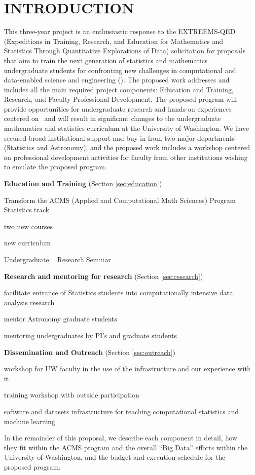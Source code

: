 \section{ INTRODUCTION}

This three-year project is an enthusiastic response to the EXTREEMS-QED (Expeditions in Training, Research, 
and Education for Mathematics and Statistics Through Quantitative Explorations of Data) solicitation for proposals
that aim to train the next generation of statistics and mathematics undergraduate students for confronting new
challenges in computational and data-enabled science and engineering (\cdse).  The proposed work addresses and 
includes all the main required project components: Education and Training, Research, and Faculty Professional 
Development. The proposed program will provide opportunities for undergraduate research and hands-on experiences 
centered on \cdse\ and will result in significant changes to the undergraduate mathematics and statistics curriculum 
at the University of Washington. We have secured broad institutional support and buy-in from two major departments 
(Statistics and Astronomy), and the proposed work includes a workshop centered on professional development activities
for faculty from other institutions wishing to emulate the proposed program. 

\bits
\item[]{\bf Education and Training} (Section \ref{sec:education}) 
\item Transform the ACMS (Applied and Computational Math Sciences) Program Statistics track
  \bits
  \item two new courses
  \item new curriculum 
  \item Undergraduate \cdse~ Research Seminar
  \eits
\item {\bf Research and mentoring for research} (Section \ref{sec:research})
  \bits
  \item facilitate entrance of Statistics students into computationally intensive data analysis research
  \item mentor Astronomy graduate students 
  \item mentoring undergraduates by PI's and graduate students
  \eits
\item {\bf Dissemination and Outreach} (Section \ref{sec:outreach})
  \bits
  \item workshop for UW faculty in the use of the infrastructure and our experience with it
  \item training workshop with outside participation 
  \item software and datasets infrastructure for teaching computational statistics and machine learning 
  \eits
\eits  


In the remainder of this proposal, we describe each component in
detail, how they fit within the ACMS program and the overall ``Big
Data'' efforts within the University of Washington, and the budget and
execution schedule for the proposed program.



